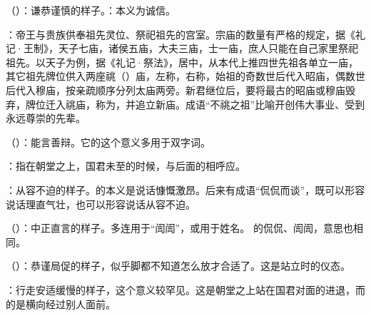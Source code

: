 \bigskip

{
\item {}（）：谦恭谨慎的样子。：本义为诚信。
\item {}：帝王与贵族供奉祖先灵位、祭祀祖先的宫室。宗庙的数量有严格的规定，据《礼记·王制》，天子七庙，诸侯五庙，大夫三庙，士一庙，庶人只能在自己家里祭祀祖先。以天子为例，据《礼记·祭法》，居中，从本代上推四世先祖各单立一庙，其它祖先牌位供入两座祧（）庙，左称，右称，始祖的奇数世后代入昭庙，偶数世后代入穆庙，按亲疏顺序分列太庙两旁。新君继位后，要将最古的昭庙或穆庙毁弃，牌位迁入祧庙，称为，并追立新庙。成语“不祧之祖”比喻开创伟大事业、受到永远尊崇的先辈。 %
\item {}（）：能言善辩。它的这个意义多用于双字词。
}
{}


{
\item {}：指在朝堂之上，国君未至的时候，与后面的相呼应。

\item {}：从容不迫的样子。的本义是说话慷慨激昂。后来有成语“侃侃而谈”，既可以形容说话理直气壮，也可以形容说话从容不迫。

（）：中正直言的样子。多连用于“訚訚”，或用于姓名。 的侃侃、訚訚，意思也相同。

\item {}（）：恭谨局促的样子，似乎脚都不知道怎么放才合适了。这是站立时的仪态。

：行走安适缓慢的样子，这个意义较罕见。这是朝堂之上站在国君对面的进退，而  的是横向经过别人面前。
}
{}  %


